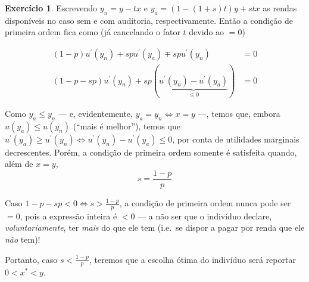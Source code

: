 \documentclass[12pt]{article}
\numberwithin{equation}{section}
\theoremstyle{plain}
\theoremstyle{definition}
\newtheorem{exercise}{Exercício}[section]
\theoremstyle{remark}
\begin{document}
\begin{exercise}
Escrevendo \(y_{n} = y-tx\) e \(y_{a}=(1-(1+s)t)y + stx\) as rendas
disponíveis no caso sem e com auditoria, respectivamente. Então a
condição de primeira ordem fica como (já cancelando o fator \(t\) devido
ao \(=0\))

\begin{align*}
(1-p) u^\prime(y_{n}) + sp u^\prime(y_{a}) \mp sp u^\prime(y_{n}) &= 0 \\
(1-p - sp) u^\prime(y_{n}) + sp (\underbrace{ u^\prime(y_{n}) - u^\prime(y_{a}) }_{ \leq 0 }) &=0
\end{align*}

Como \(y_{a} \leq y_{n}\) --- e, evidentemente,
\(y_{a}=y_{n} \iff x = y\) ---, temos que, embora
\(u(y_{a}) \leq u(y_{n})\) (``mais é melhor''), temos que
\(u^\prime(y_{a}) \geq u^\prime(y_{n}) \iff u^\prime(y_{n})- u^\prime(y_{a}) \leq 0\),
por conta de utilidades marginais decrescentes. Porém, a condição de
primeira ordem somente é satisfeita quando, além de \(x=y\),
\[
s = \frac{1-p}{p}
\]

Caso \(1- p - sp < 0 \iff s > \frac{1-p}{p}\), a condição de primeira
ordem nunca pode ser \(=0\), pois a expressão inteira é \(<0\) --- a não
ser que o indivíduo declare, \textit{voluntariamente}, ter \textit{mais}
do que ele tem (i.e.~se dispor a pagar por renda que ele \textit{não}
tem)!

Portanto, caso \(s < \frac{1-p}{p}\), teremos que a escolha ótima do
indivíduo será reportar \(0 < x^{*} < y\).
\end{exercise}
\end{document}
